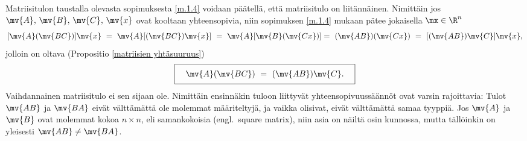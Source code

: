 Matriisitulon taustalla olevasta sopimuksesta \eqref{m.1.4} voidaan päätellä, että matriisitulo
on liitännäinen. Nimittäin jos $\mv{A},\,\mv{B},\,\mv{C},\,\mv{x}$ ovat kooltaan yhteensopivia,
niin sopimuksen \eqref{m.1.4} mukaan pätee jokaisella $\mx\in\R^n$
\[ 
[\mv{A}(\mv{BC})]\mv{x}\ =\ \mv{A}[(\mv{BC})\mv{x}]\ =\ \mv{A}[\mv{B}(\mv{Cx})] 
                         =\ (\mv{AB})(\mv{Cx})\ =\ [(\mv{AB})\mv{C}]\mv{x}, 
\]
jolloin on oltava (Propositio \ref{matriisien yhtäsuuruus})
\[ 
\boxed{ \quad \rule[-2mm]{0mm}{6mm}\mv{A}(\mv{BC})\ =\ (\mv{AB})\mv{C}. \quad } 
\]
Vaihdannainen matriisitulo ei sen sijaan ole. Nimittäin ensinnäkin tuloon liittyvät 
yhteensopivuussäännöt ovat varsin rajoittavia: Tulot $\mv{AB}$ ja $\mv{BA}$ eivät välttämättä
ole molemmat määriteltyjä, ja vaikka olisivat, eivät välttämättä samaa tyyppiä. Jos $\mv{A}$ ja
$\mv{B}$ ovat molemmat kokoa $n \times n$, eli samankokoisia
%
 (engl.\ square matrix), niin asia on näiltä osin kunnossa, mutta
tällöinkin on yleisesti $\mv{AB} \neq \mv{BA}$.

